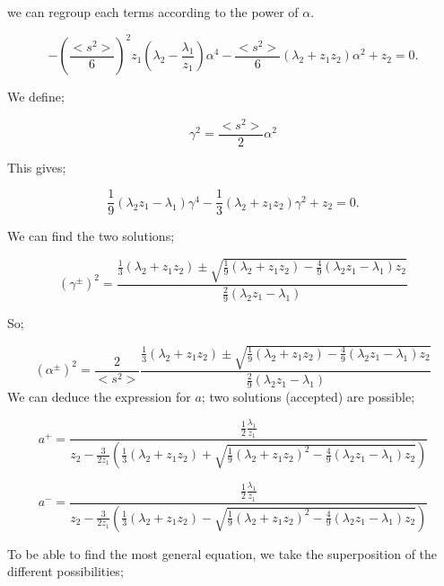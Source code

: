 \documentclass[preprint,12pt]{elsarticle}
\newcommand{\bl}{\big<}
\newcommand{\bg}{\big>}
\begin{document}
we can regroup each terms according to the power of $\alpha$.

\begin{equation}
-\left(\frac{\bl s^2 \bg}{6}\right)^2z_1\left(\lambda_2-\frac{\lambda_1}{z_1}\right)\alpha^4-\frac{\bl s^2 \bg}{6}\left(\lambda_2+z_1z_2\right)\alpha^2+z_2 = 0.
\end{equation}

We define;

\begin{equation}
\gamma^2 = \frac{\bl s^2 \bg}{2}\alpha^2
\end{equation}

This gives;

\begin{equation}
\frac{1}{9}\left(\lambda_2z_1-\lambda_1\right)\gamma^4-\frac{1}{3}\left(\lambda_2+z_1z_2\right)\gamma^2+z_2 = 0.
\end{equation}

We can find the two solutions;

\begin{equation}
\left(\gamma^{\pm}\right)^2= \frac{\frac{1}{3}(\lambda_2+z_1z_2) \pm \sqrt{\frac{1}{9}(\lambda_2+z_1z_2) - \frac{4}{9}(\lambda_2z_1-\lambda_1)z_2}}{ \frac{2}{9}(\lambda_2z_1-\lambda_1)}
\end{equation}

So;

\begin{equation}
\left(\alpha^{\pm}\right)^2= \frac{2}{\bl s^2 \bg} \frac{\frac{1}{3}(\lambda_2+z_1z_2) \pm \sqrt{\frac{1}{9}(\lambda_2+z_1z_2) - \frac{4}{9}(\lambda_2z_1-\lambda_1)z_2}}{ \frac{2}{9}(\lambda_2z_1-\lambda_1)}
\end{equation}
We can deduce the expression for $a$; two solutions (accepted) are possible;

\begin{equation}
a^+ = \frac{\frac{1}{2}\frac{\lambda_1}{z_1}}{z_2-\frac{3}{2z_1}\left(\frac{1}{3}\left(\lambda_2+z_1z_2\right) + \sqrt{\frac{1}{9}(\lambda_2+z_1z_2)^2 - \frac{4}{9}(\lambda_2z_1-\lambda_1)z_2}\right)}
\end{equation}

\begin{equation}
a^- = \frac{\frac{1}{2}\frac{\lambda_1}{z_1}}{z_2-\frac{3}{2z_1}\left(\frac{1}{3}\left(\lambda_2+z_1z_2\right) - \sqrt{\frac{1}{9}(\lambda_2+z_1z_2)^2 - \frac{4}{9}(\lambda_2z_1-\lambda_1)z_2}\right)}
\end{equation}

To be able to find the most general equation, we take the superposition of the different possibilities;
\end{document}
